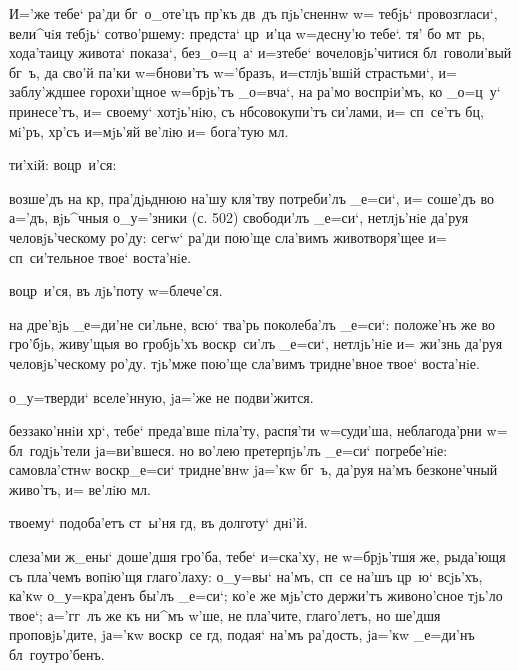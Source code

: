  И='же тебе` 
ра'ди бг~о_оте'цъ пр'къ дв~дъ пjь'сненнw w= тебjь` 
провозгласи`, вели^чiя тебjь` сотво'ршему: предста` 
цр~и'ца w=десну'ю тебе`. тя' бо мт~рь, хода'таицу живота` 
показа`, без\ъ _о=ц~а` и=з\ъ тебе` вочеловjь'читися 
бл~говоли'вый бг~ъ, да сво'й па'ки w=бнови'тъ w='бразъ, 
и=стлjь'вшiй страстьми`, и= заблу'ждшее горохи'щное 
w=брjь'тъ _о=вча`, на ра'мо воспрiи'мъ, ко _о=ц~у` 
принесе'тъ, и= своему` хотjь'нiю, съ нб совокупи'тъ 
си'лами, и= сп~се'тъ бц, мi'ръ, хр'съ и=мjь'яй 
ве'лiю и= бога'тую мл.

  ти'хiй:   
воцр~и'ся: 


 возше'дъ на кр, пра'дjьднюю на'шу 
кля'тву потреби'лъ _е=си`, и= соше'дъ во а='дъ, вjь^чныя 
о_у='зники (с. 502) свободи'лъ _е=си`, нетлjь'нiе да'руя 
человjь'ческому ро'ду: сегw` ра'ди пою'ще сла'вимъ 
животворя'щее и= сп~си'тельное твое` воста'нiе.


  воцр~и'ся, въ лjь'поту w=блече'ся.

 на дре'вjь _е=ди'не си'льне, всю` 
тва'рь поколеба'лъ _е=си`: положе'нъ же во гро'бjь, 
живу'щыя во гробjь'хъ воскр~си'лъ _е=си`, нетлjь'нiе и= 
жи'знь да'руя человjь'ческому ро'ду. тjь'мже пою'ще 
сла'вимъ тридне'вное твое` воста'нiе.

  о_у=тверди` вселе'нную, jа='же не 
подви'жится.

 беззако'ннiи хр`, тебе` преда'вше 
пiла'ту, распя'ти w=суди'ша, неблагода'рни w= 
бл~годjь'тели jа=ви'вшеся. но во'лею претерпjь'лъ _е=си` 
погребе'нiе: самовла'стнw воскр _е=си` тридне'внw 
jа='кw бг~ъ, да'руя на'мъ безконе'чный живо'тъ, и= ве'лiю 
мл.

  твоему` подоба'етъ ст~ы'ня гд, въ 
долготу` днi'й.

 слеза'ми ж_ены` доше'дшя гро'ба, тебе` 
и=ска'ху, не w=брjь'тшя же, рыда'ющя съ пла'чемъ вопiю'щя 
глаго'лаху: о_у=вы` на'мъ, сп~се на'шъ цр~ю` всjь'хъ, 
ка'кw о_у=кра'денъ бы'лъ _е=си`; ко'е же мjь'сто держи'тъ 
живоно'сное тjь'ло твое`; а='гг~лъ же къ ни^мъ 
w'ше, не пла'чите, глаго'летъ, но ше'дшя 
проповjь'дите, jа='кw воскр~се гд, подая` на'мъ 
ра'дость, jа='кw _е=ди'нъ бл~гоутро'бенъ.

